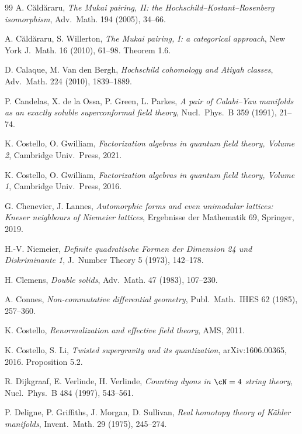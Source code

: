 \documentclass[11pt,reqno]{amsart}
\theoremstyle{plain}
\theoremstyle{definition}
\theoremstyle{remark}
\begin{document}
\begin{thebibliography}{99}
 A. C\u{a}ld\u{a}raru, \emph{The Mukai pairing, II: the Hochschild--Kostant--Rosenberg isomorphism}, Adv.~Math. 194 (2005), 34--66.

 A. C\u{a}ld\u{a}raru, S. Willerton, \emph{The Mukai pairing, I: a categorical approach}, New York J.~Math. 16 (2010), 61--98. Theorem 1.6.

 D. Calaque, M. Van den Bergh, \emph{Hochschild cohomology and Atiyah classes}, Adv.~Math. 224 (2010), 1839--1889.

 P. Candelas, X. de la Ossa, P. Green, L. Parkes, \emph{A pair of Calabi--Yau manifolds as an exactly soluble superconformal field theory}, Nucl.~Phys.~B 359 (1991), 21--74.

 K. Costello, O. Gwilliam, \emph{Factorization algebras in quantum field theory, Volume 2}, Cambridge Univ.\ Press, 2021.

 K. Costello, O. Gwilliam, \emph{Factorization algebras in quantum field theory, Volume 1}, Cambridge Univ.\ Press, 2016.

 G. Chenevier, J. Lannes, \emph{Automorphic forms and even unimodular lattices: Kneser neighbours of Niemeier lattices}, Ergebnisse der Mathematik 69, Springer, 2019.

 H.-V. Niemeier, \emph{Definite quadratische Formen der Dimension 24 und Diskriminante 1}, J.~Number Theory 5 (1973), 142--178.

 H. Clemens, \emph{Double solids}, Adv.~Math. 47 (1983), 107--230.

 A. Connes, \emph{Non-commutative differential geometry}, Publ.~Math.~IHES 62 (1985), 257--360.

 K. Costello, \emph{Renormalization and effective field theory}, AMS, 2011.

 K. Costello, S. Li, \emph{Twisted supergravity and its quantization}, arXiv:1606.00365, 2016. Proposition 5.2.

 R. Dijkgraaf, E. Verlinde, H. Verlinde, \emph{Counting dyons in $\cN = 4$ string theory}, Nucl.~Phys.~B 484 (1997), 543--561.

 P. Deligne, P. Griffiths, J. Morgan, D. Sullivan, \emph{Real homotopy theory of K\"ahler manifolds}, Invent.~Math. 29 (1975), 245--274.


\end{thebibliography}
\end{document}
